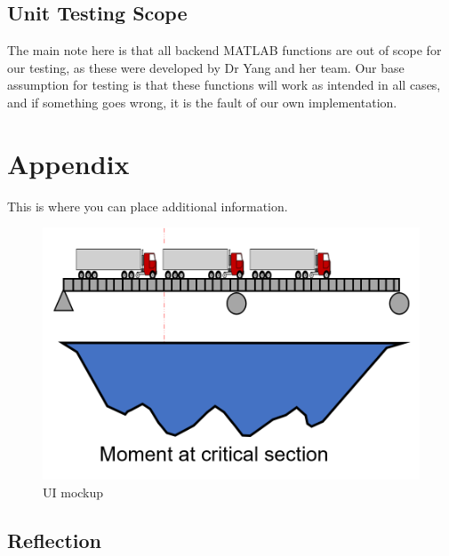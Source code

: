 \documentclass[12pt, titlepage]{article}
\begin{document}
\subsection{Unit Testing Scope}
The main note here is that all backend MATLAB functions are out of scope for our testing, as these were developed by Dr Yang and her team. Our base assumption for testing
is that these functions will work as intended in all cases, and if something goes wrong, it is the fault of our own implementation. 


\newpage

\section{Appendix}

This is where you can place additional information.

\begin{figure}[h]
  \includegraphics[width=\linewidth]{UI.png}
  \caption{UI mockup}
  \label {fig:ui-mockup}
\end{figure}



\newpage{}
\subsection{Reflection}
\end{document}
